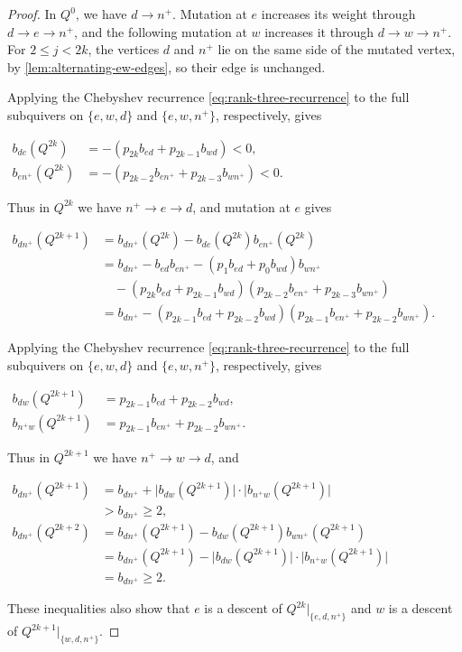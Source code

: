 \documentclass[10pt,a4paper]{amsart}
\theoremstyle{definition}
\theoremstyle{definition}
\numberwithin{equation}{section}
\numberwithin{table}{section}
\newcommand{\Qalt}[1]{Q^{#1}}
\newenvironment{weightcalc}
  {\par\addvspace{4pt}\indent$\displaystyle\begin{aligned}}
  {\end{aligned}$\par\addvspace{4pt}\ignorespacesafterend}
\begin{document}
\begin{proof}
In $\Qalt{0}$, we have $d\to n^+$. Mutation at $e$ increases its weight through
$d\to e\to n^+$, and the following mutation at $w$ increases it through
$d\to w\to n^+$. For $2\le j<2k$, the vertices $d$ and $n^+$ lie on the
same side of the mutated vertex, by \cref{lem:alternating-ew-edges}, so their
edge is unchanged.

Applying the Chebyshev recurrence \eqref{eq:rank-three-recurrence} to the full
subquivers on $\{e,w,d\}$ and $\{e,w,n^+\}$, respectively, gives
\begin{weightcalc}
 b_{de}(\Qalt{2k})
  &=-(p_{2k}b_{ed}+p_{2k-1}b_{wd})<0,\\
 b_{en^+}(\Qalt{2k})
  &=-(p_{2k-2}b_{en^+}+p_{2k-3}b_{wn^+})<0.
 \end{weightcalc}
Thus in $\Qalt{2k}$ we have $n^+\to e\to d$, and mutation at $e$ gives
\begin{weightcalc}
 b_{dn^+}(\Qalt{2k+1})
 &=b_{dn^+}(\Qalt{2k})
   -b_{de}(\Qalt{2k})b_{en^+}(\Qalt{2k})\\
 &=b_{dn^+}-b_{ed}b_{en^+}
   -(p_1b_{ed}+p_0b_{wd})b_{wn^+}\\
 &\quad
   -(p_{2k}b_{ed}+p_{2k-1}b_{wd})
    (p_{2k-2}b_{en^+}+p_{2k-3}b_{wn^+})\\
 &=b_{dn^+}-(p_{2k-1}b_{ed}+p_{2k-2}b_{wd})
   (p_{2k-1}b_{en^+}+p_{2k-2}b_{wn^+}).
 \end{weightcalc}
Applying the Chebyshev recurrence \eqref{eq:rank-three-recurrence} to the full
subquivers on $\{e,w,d\}$ and $\{e,w,n^+\}$, respectively, gives
\begin{weightcalc}
 b_{dw}(\Qalt{2k+1})&=p_{2k-1}b_{ed}+p_{2k-2}b_{wd},\\
 b_{n^+w}(\Qalt{2k+1})&=p_{2k-1}b_{en^+}+p_{2k-2}b_{wn^+}.
\end{weightcalc}
Thus in $\Qalt{2k+1}$ we have $n^+\to w\to d$, and
\begin{weightcalc}
 b_{dn^+}(\Qalt{2k+1})
 &=b_{dn^+}
  +\lvert b_{dw}(\Qalt{2k+1})\rvert
   \cdot\lvert b_{n^+w}(\Qalt{2k+1})\rvert\\
 &>b_{dn^+}\ge2,\\[2pt]
 b_{dn^+}(\Qalt{2k+2})
 &=b_{dn^+}(\Qalt{2k+1})
   -b_{dw}(\Qalt{2k+1})b_{wn^+}(\Qalt{2k+1})\\
 &=b_{dn^+}(\Qalt{2k+1})
   -\lvert b_{dw}(\Qalt{2k+1})\rvert
    \cdot\lvert b_{n^+w}(\Qalt{2k+1})\rvert\\
 &=b_{dn^+}\ge2.
\end{weightcalc}
These inequalities also show that $e$ is a descent of
$\Qalt{2k}|_{\{e,d,n^+\}}$ and $w$ is a descent of
$\Qalt{2k+1}|_{\{w,d,n^+\}}$.
\end{proof}
\end{document}
